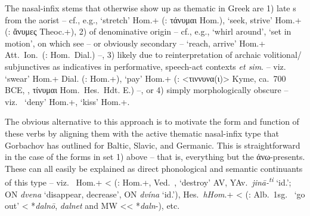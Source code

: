 \documentclass[output=paper,colorlinks,citecolor=brown]{langscibook}
\begin{document}
{\begin{enumerate}
\end{enumerate}  The nasal-infix stems that otherwise show up as thematic in Greek are 1) late s from the aorist -- cf., e.g.,   ‘stretch’ Hom.+ (: τάνυμαι Hom.),   ‘seek, strive’ Hom.+ (: ἅνυμες  Theoc.+), 2) of denominative origin -- cf., e.g.,   ‘whirl around',   ‘set in motion', on which see \citealt{Nikolaev2025MSS, Nikolaev2025glotta} -- or obviously secondary --  ‘reach, arrive’ Hom.+ Att.\ Ion.\ (:   Hom.\ Dial.) --, 3) likely due to reinterpretation of archaic volitional/ subjunctives as indicatives in performative, speech-act contexts \textit{et sim}. -- viz.\   ‘swear’ Hom.+ Dial. (:  Hom.+),   ‘pay’ Hom.+ (: <τιννυνα(ι)> Kyme, ca.\ 700 BCE, 
 \citealt[201--214]{BartonekBuchner1995}, τίνυμαι Hom.\ Hes.\ Hdt. E.) --, or 4) simply morphologically obscure -- viz.\  ‘deny’ Hom.+,   ‘kiss’ Hom.+.} 

The obvious alternative to this approach is to motivate the form and function of these verbs by aligning them with the active thematic nasal-infix   type that Gorbachov has outlined for Baltic, Slavic, and Germanic. This is straightforward in the case of the forms in set 1) above -- that is, everything but the άνω-presents.  These can all easily be explained as direct phonological and semantic continuants of this type -- viz.\   Hom.+ <  (:   Hom.+, Ved.\ ,  ‘destroy’ AV, YAv.\ \textit{jinā-\textsuperscript{ti}}  ‘id.’; ON \textit{dvena} ‘disappear, decrease', ON \textit{dvína}  ‘id.’),   Hes.\ \textit{hHom}.+ <  (: Alb.\ 1sg.\  ‘go out’ < *\textit{dalnō}, \textit{dalnet} and MW  {<}{<} *\textit{daln}-), etc. 
\end{document}
